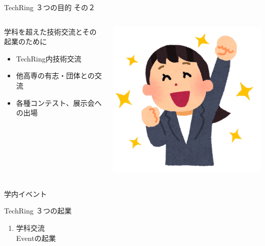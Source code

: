 \documentclass[dvipdfmx]{beamer}
\begin{document}
\begin{frame}{TechRing ３つの目的 その２}

  \begin{columns}[totalwidth=\textwidth]
    \begin{column}{0.7\textwidth}
      \begin{greyblock}{学科を超えた技術交流とその起業のために}
        \vspace{1mm}
        \begin{itemize}
          \item \alert{TechRing内技術交流}
          \item \alert{他高専の有志・団体との交流}
          \item \alert{各種コンテスト、展示会への出場}
        \end{itemize}
      \end{greyblock}
    \end{column}
    \begin{column}{0.25\textwidth}
      \includegraphics[scale=.25]{pic/mokuhyou2.png}
    \end{column}
  \end{columns}

  \begin{columns}
    \begin{column}{0.30\textwidth}
      \begin{block}{学内イベント}
        \begin{footnotesize}
          TechRing ３つの起業
          \begin{enumerate}
            \item 学科交流\\Eventの起業
          \end{enumerate}
        \end{footnotesize}
      \end{block}
    \end{column}


\end{columns}
\end{frame}
\end{document}
